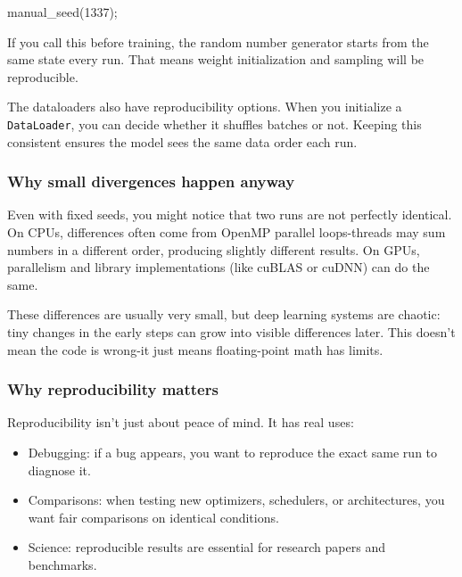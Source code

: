 \documentclass[
  letterpaper,
  DIV=11,
  numbers=noendperiod]{scrreprt}
\newenvironment{Shaded}{\begin{snugshade}}{\end{snugshade}}
\newcommand{\DecValTok}[1]{\textcolor[rgb]{0.68,0.00,0.00}{#1}}
\newcommand{\NormalTok}[1]{\textcolor[rgb]{0.00,0.23,0.31}{#1}}
\newcommand{\OperatorTok}[1]{\textcolor[rgb]{0.37,0.37,0.37}{#1}}
\providecommand{\tightlist}{%
  \setlength{\itemsep}{0pt}\setlength{\parskip}{0pt}}
\begin{document}
\begin{Shaded}
\begin{Highlighting}[]
\NormalTok{manual\_seed}\OperatorTok{(}\DecValTok{1337}\OperatorTok{);}  
\end{Highlighting}
\end{Shaded}

If you call this before training, the random number generator starts
from the same state every run. That means weight initialization and
sampling will be reproducible.

The dataloaders also have reproducibility options. When you initialize a
\texttt{DataLoader}, you can decide whether it shuffles batches or not.
Keeping this consistent ensures the model sees the same data order each
run.

\subsubsection{Why small divergences happen
anyway}\label{why-small-divergences-happen-anyway}

Even with fixed seeds, you might notice that two runs are not perfectly
identical. On CPUs, differences often come from OpenMP parallel
loops-threads may sum numbers in a different order, producing slightly
different results. On GPUs, parallelism and library implementations
(like cuBLAS or cuDNN) can do the same.

These differences are usually very small, but deep learning systems are
chaotic: tiny changes in the early steps can grow into visible
differences later. This doesn't mean the code is wrong-it just means
floating-point math has limits.

\subsubsection{Why reproducibility
matters}\label{why-reproducibility-matters}

Reproducibility isn't just about peace of mind. It has real uses:

\begin{itemize}
\tightlist
\item
  Debugging: if a bug appears, you want to reproduce the exact same run
  to diagnose it.
\item
  Comparisons: when testing new optimizers, schedulers, or
  architectures, you want fair comparisons on identical conditions.
\item
  Science: reproducible results are essential for research papers and
  benchmarks.
\end{itemize}
\end{document}
